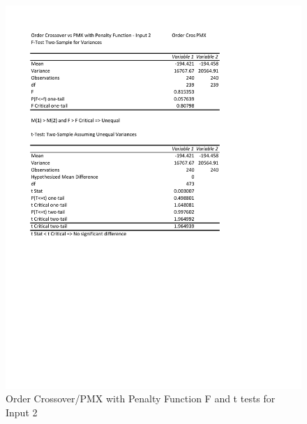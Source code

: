 \documentclass[times]{article}
\begin{document}
	\begin{figure}
		\caption{Order Crossover/PMX with Penalty Function F and t tests for Input 2}
		\label{fig:order_pmx_penalty2}
		\includegraphics[width=\textwidth]{./t_test/order_pmx_penalty2}
	\end{figure}
\end{document}
